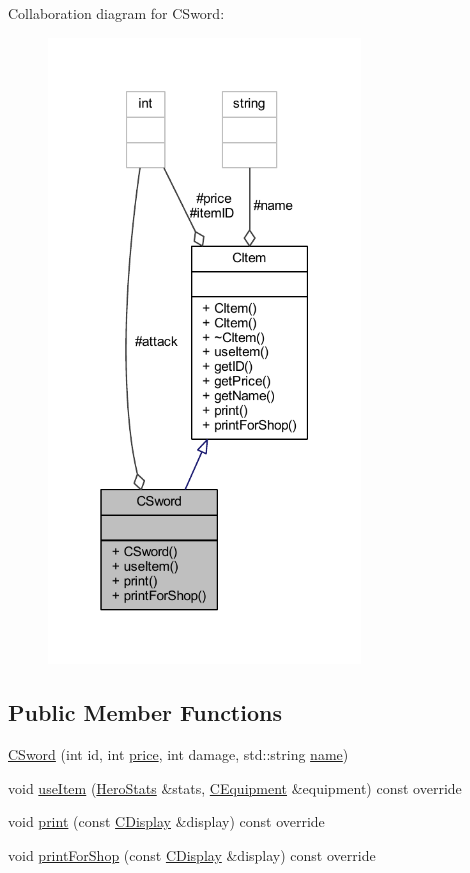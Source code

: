 Collaboration diagram for C\+Sword\+:\nopagebreak
\begin{figure}[H]
\begin{center}
\leavevmode
\includegraphics[width=235pt]{class_c_sword__coll__graph}
\end{center}
\end{figure}
\subsection*{Public Member Functions}
\begin{DoxyCompactItemize}
\item 
\mbox{\hyperlink{class_c_sword_a7947908b12f450ca3d15143345bda422}{C\+Sword}} (int id, int \mbox{\hyperlink{class_c_item_ad2512107bbbb688e9141a5d5ea6d47de}{price}}, int damage, std\+::string \mbox{\hyperlink{class_c_item_a4d8b073203d9d09291e0fd07f4bcc479}{name}})
\item 
void \mbox{\hyperlink{class_c_sword_a565b01124ed0c92e6873dcc0263d4a79}{use\+Item}} (\mbox{\hyperlink{struct_hero_stats}{Hero\+Stats}} \&stats, \mbox{\hyperlink{class_c_equipment}{C\+Equipment}} \&equipment) const override
\item 
void \mbox{\hyperlink{class_c_sword_a8d8f4502742e5905d2be1f4d0157b6be}{print}} (const \mbox{\hyperlink{class_c_display}{C\+Display}} \&display) const override
\item 
void \mbox{\hyperlink{class_c_sword_a7871b74b03a5ee130925e7f20d8107ef}{print\+For\+Shop}} (const \mbox{\hyperlink{class_c_display}{C\+Display}} \&display) const override
\end{DoxyCompactItemize}
